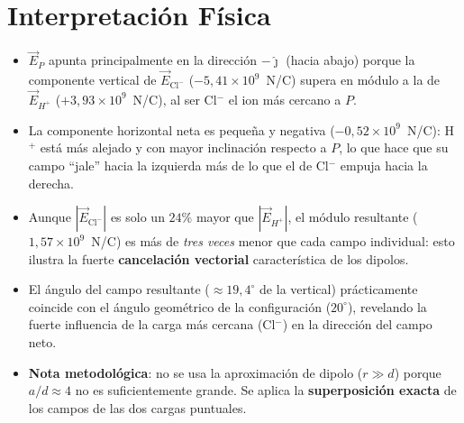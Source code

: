 \documentclass[12pt,letterpaper]{article}
\begin{document}
\section*{Interpretaci\'on F\'isica}

\begin{itemize}
    \item $\vec{E}_P$ apunta principalmente en la direcci\'on $-\hat{\jmath}$
    (hacia abajo) porque la componente vertical de $\vec{E}_{\text{Cl}^-}$
    ($-5{,}41\times10^{9}$~N/C) supera en m\'odulo a la de $\vec{E}_{H^+}$
    ($+3{,}93\times10^{9}$~N/C), al ser Cl$^-$ el ion m\'as cercano a $P$.

    \item La componente horizontal neta es peque\~na y negativa
    ($-0{,}52\times10^{9}$~N/C): H$^+$ est\'a m\'as alejado y con mayor
    inclinaci\'on respecto a $P$, lo que hace que su campo ``jale'' hacia la
    izquierda m\'as de lo que el de Cl$^-$ empuja hacia la derecha.

    \item Aunque $|\vec{E}_{\text{Cl}^-}|$ es solo un $24\%$ mayor que
    $|\vec{E}_{H^+}|$, el m\'odulo resultante ($1{,}57\times10^{9}$~N/C) es
    m\'as de \textit{tres veces} menor que cada campo individual: esto ilustra
    la fuerte \textbf{cancelaci\'on vectorial} caracter\'istica de los dipolos.

    \item El \'angulo del campo resultante ($\approx 19{,}4^\circ$ de la vertical)
    pr\'acticamente coincide con el \'angulo geom\'etrico de la configuraci\'on
    ($20^\circ$), revelando la fuerte influencia de la carga m\'as cercana
    (Cl$^-$) en la direcci\'on del campo neto.

    \item \textbf{Nota metodol\'ogica}: no se usa la aproximaci\'on de dipolo
    ($r \gg d$) porque $a/d \approx 4$ no es suficientemente grande. Se aplica
    la \textbf{superposici\'on exacta} de los campos de las dos cargas puntuales.
\end{itemize}
\end{document}
